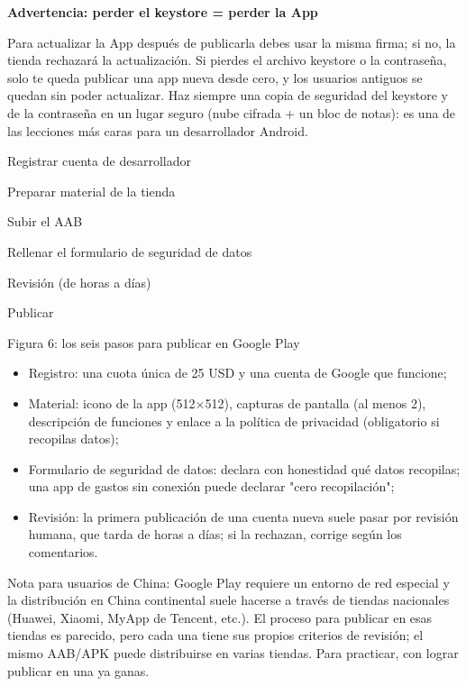 \textbf{Advertencia: perder el keystore = perder la App}\par

Para actualizar la App después de publicarla debes usar la misma firma; si no, la tienda rechazará la actualización. Si pierdes el archivo keystore o la contraseña, solo te queda publicar una app nueva desde cero, y los usuarios antiguos se quedan sin poder actualizar. Haz siempre una copia de seguridad del keystore y de la contraseña en un lugar seguro (nube cifrada + un bloc de notas): es una de las lecciones más caras para un desarrollador Android.


Registrar cuenta de desarrollador

Preparar material de la tienda

Subir el AAB

Rellenar el formulario de seguridad de datos

Revisión (de horas a días)

Publicar

\begin{center}\small\color{gray}Figura 6: los seis pasos para publicar en Google Play\end{center}

\begin{itemize}
  \item Registro: una cuota única de 25 USD y una cuenta de Google que funcione;
  \item Material: icono de la app (512×512), capturas de pantalla (al menos 2), descripción de funciones y enlace a la política de privacidad (obligatorio si recopilas datos);
  \item Formulario de seguridad de datos: declara con honestidad qué datos recopilas; una app de gastos sin conexión puede declarar "cero recopilación";
  \item Revisión: la primera publicación de una cuenta nueva suele pasar por revisión humana, que tarda de horas a días; si la rechazan, corrige según los comentarios.
\end{itemize}

Nota para usuarios de China: Google Play requiere un entorno de red especial y la distribución en China continental suele hacerse a través de tiendas nacionales (Huawei, Xiaomi, MyApp de Tencent, etc.). El proceso para publicar en esas tiendas es parecido, pero cada una tiene sus propios criterios de revisión; el mismo AAB/APK puede distribuirse en varias tiendas. Para practicar, con lograr publicar en una ya ganas.

